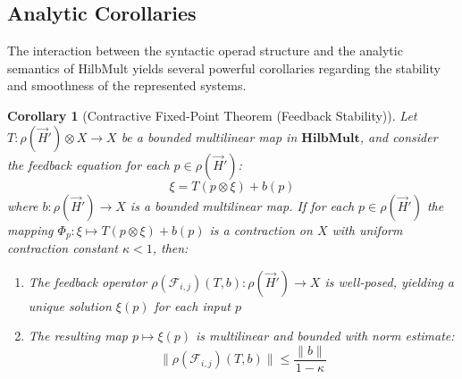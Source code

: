 \documentclass[11pt]{article}
\newtheorem{corollary}{Corollary}
\begin{document}
\subsection{Analytic Corollaries}\label{sec:Analytic Corollaries}

The interaction between the syntactic operad structure and the analytic semantics of  HilbMult  yields several powerful corollaries regarding the stability and smoothness of the represented systems.

\begin{corollary}[Contractive Fixed-Point Theorem (Feedback Stability)]\label{cor:feedback-stability}
Let \( T: \rho(\vec{H}') \otimes X \to X \) be a bounded multilinear map in \(\mathbf{HilbMult}\), and consider the feedback equation for each \( p \in \rho(\vec{H}') \):
\[
\xi = T(p \otimes \xi) + b(p)
\]
where \( b: \rho(\vec{H}') \to X \) is a bounded multilinear map. If for each \( p \in \rho(\vec{H}') \) the mapping \( \Phi_p: \xi \mapsto T(p \otimes \xi) + b(p) \) is a contraction on \( X \) with uniform contraction constant \( \kappa < 1 \), then:

\begin{enumerate}
    \item The feedback operator \( \rho(\mathcal{F}_{i,j})(T,b): \rho(\vec{H}') \to X \) is well-posed, yielding a unique solution \( \xi(p) \) for each input \( p \)
    \item The resulting map \( p \mapsto \xi(p) \) is multilinear and bounded with norm estimate:
    \[
    \|\rho(\mathcal{F}_{i,j})(T,b)\| \le \frac{\|b\|}{1 - \kappa}
    \]
\end{enumerate}
\end{corollary}
\end{document}
